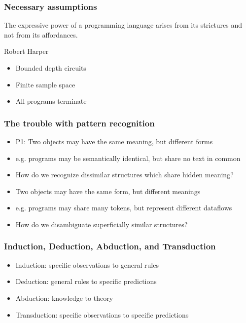 \documentclass{beamer}
\begin{document}
    \begin{frame}
        \frametitle{Necessary assumptions}
        \setlength{\epigraphwidth}{0.5\textwidth}
        \epigraph{The expressive power of a programming language arises from its strictures and not from its affordances.}{Robert Harper}
        \begin{itemize}
            \item Bounded depth circuits
            \item Finite sample space
            \item All programs terminate
        \end{itemize}
    \end{frame}

    \begin{frame}
        \frametitle{The trouble with pattern recognition}
        \begin{itemize}
            \item P1: Two objects may have the same meaning, but different forms
            \item e.g. programs may be semantically identical, but share no text in common
            \item How do we recognize dissimilar structures which share hidden meaning?
            \item Two objects may have the same form, but different meanings
            \item e.g. programs may share many tokens, but represent different dataflows
            \item How do we disambiguate superficially similar structures?
        \end{itemize}
    \end{frame}

    \begin{frame}
        \frametitle{Induction, Deduction, Abduction, and Transduction}
        \begin{itemize}
            \item Induction: specific observations to general rules
            \item Deduction: general rules to specific predictions
            \item Abduction: knowledge to theory
            \item Transduction: specific observations to specific predictions
        \end{itemize}
    \end{frame}
\end{document}
